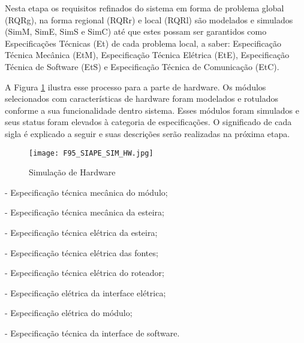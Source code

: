  	
 Nesta etapa os requisitos refinados do sistema em forma de problema global (RQRg), na forma regional  (RQRr) e local (RQRl) são modelados e simulados (SimM, SimE, SimS e SimC) até que estes possam ser garantidos como Especificações Técnicas (Et) de cada problema local, a saber: Especificação Técnica Mecânica (EtM), Especificação Técnica Elétrica (EtE), Especificação Técnica de Software (EtS) e Especificação Técnica de Comunicação (EtC). 
 
A Figura \ref{F95} ilustra esse processo para a parte de hardware. Os módulos selecionados com características de hardware foram modelados e rotulados conforme a sua funcionalidade dentro sistema. Esses módulos foram simulados e seus status  foram elevados à categoria de especificações. O significado de cada sigla é explicado a seguir e suas descrições serão realizadas na próxima etapa. 
	\begin{description}
	\begin{figure}[!h]
	\centering
	\texttt{[image: F95\_SIAPE\_SIM\_HW.jpg]} 
	\caption{Simulação de Hardware}
	\label{F95}
	\end{figure}  
		
		\item[1. EtMm] - Especificação técnica mecânica do módulo;
		\item[2. EtMe] - Especificação técnica mecânica da esteira;
		\item[3. EtEe] - Especificação técnica elétrica da esteira;
		\item[4. EtEf] - Especificação técnica elétrica das fontes;
		\item[5. EtEr] - Especificação técnica elétrica do roteador;
		\item[6. EtEie] - Especificação elétrica da interface elétrica; 
		\item[7. EtEm] - Especificação elétrica do módulo;
		\item[8. EtSis] - Especificação técnica da interface de software.
		
		\end{description}	
		
